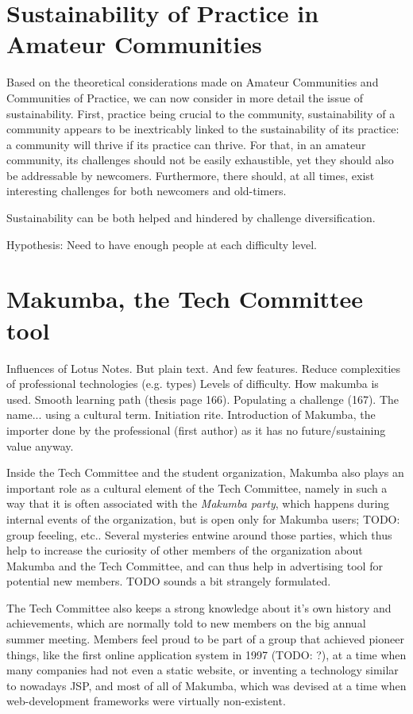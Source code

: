 \documentclass{acm_proc_article-sp}
\begin{document}
\section{Sustainability of Practice in Amateur Communities}\label{sec:sust}
Based on the theoretical considerations made on Amateur Communities and Communities of Practice, we can now consider in more detail the issue of sustainability. First, practice being crucial to the community, sustainability of a community appears to be inextricably linked to the sustainability of its practice: a community will thrive if its practice can thrive. For that, in an amateur community, its challenges should not be easily exhaustible, yet they should also be addressable by newcomers. Furthermore, there should, at all times, exist interesting challenges for both newcomers and old-timers. 

Sustainability can be both helped and hindered by challenge diversification.

Hypothesis: Need to have enough people at each difficulty level.

\section{Makumba, the Tech Committee tool}\label{sec:makumba}
Influences of Lotus Notes.
But plain text.
And few features.
Reduce complexities of professional technologies (e.g. types)
Levels of difficulty. How makumba is used. Smooth learning path (thesis page 166).
Populating a challenge (167).
The name... using a cultural term. Initiation rite. 
Introduction of Makumba, the importer done by the professional (first author) as it has no future/sustaining value anyway.

Inside the Tech Committee and the student organization, Makumba also plays an important role as a cultural element of the Tech Committee, namely in such a way that it is often associated with the \textit{Makumba party}, which happens during internal events of the organization, but is open only for Makumba users; TODO: group feeeling, etc.. 
Several mysteries entwine around those parties, which thus help to increase the curiosity of other members of the organization about Makumba and the Tech Committee, and can thus help in advertising tool for potential new members. TODO sounds a bit strangely formulated.

The Tech Committee also keeps a strong knowledge about it's own history and achievements, which are normally told to new members on the big annual summer meeting. Members feel proud to be part of a group that achieved pioneer things, like the first online application system in 1997 (TODO: ?), at a time when many companies had not even a static website, or inventing a technology similar to nowadays JSP, and most of all of Makumba, which was devised at a time when web-development frameworks were virtually non-existent.
\end{document}
